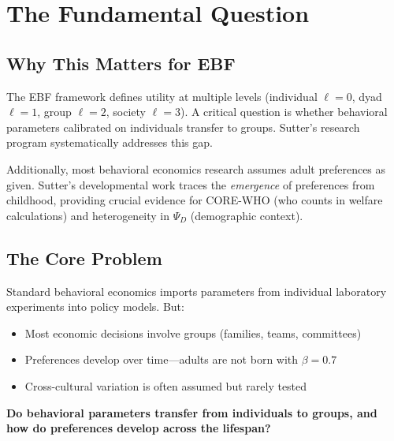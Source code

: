 \section{The Fundamental Question}
\label{sec:su-fundamental}

\subsection{Why This Matters for EBF}

The EBF framework defines utility at multiple levels (individual $\ell = 0$, dyad $\ell = 1$, group $\ell = 2$, society $\ell = 3$). A critical question is whether behavioral parameters calibrated on individuals transfer to groups. Sutter's research program systematically addresses this gap.

Additionally, most behavioral economics research assumes adult preferences as given. Sutter's developmental work traces the \textit{emergence} of preferences from childhood, providing crucial evidence for CORE-WHO (who counts in welfare calculations) and heterogeneity in $\Psi_D$ (demographic context).

\subsection{The Core Problem}

Standard behavioral economics imports parameters from individual laboratory experiments into policy models. But:
\begin{itemize}
\item Most economic decisions involve groups (families, teams, committees)
\item Preferences develop over time---adults are not born with $\beta = 0.7$
\item Cross-cultural variation is often assumed but rarely tested
\end{itemize}

\begin{tcolorbox}[colback=red!5!white, colframe=red!75!black,
    title=The Fundamental Question]
\textbf{Do behavioral parameters transfer from individuals to groups, and how do preferences develop across the lifespan?}
\end{tcolorbox}


